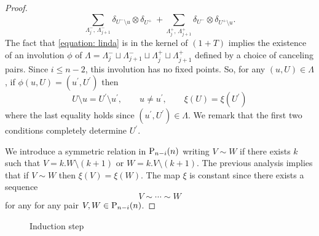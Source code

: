 \begin{proof}
    \begin{equation} \label{equation: linda}
    \sum_{\Lambda_j^-,\, \Lambda_{j+1}^-} \delta_{U^- \setminus u} \otimes \delta_{U^+} \ +
    \sum_{\Lambda_j^+,\, \Lambda_{j+1}^+} \delta_{U^-} \otimes \delta_{U^+ \setminus u}.
    \end{equation}
    The fact that \eqref{equation: linda} is in the kernel of $(1+T)$ implies the existence of an involution $\phi$ of $\Lambda = \Lambda^-_{j} \sqcup \Lambda^-_{j+1} \sqcup \Lambda^+_{j} \sqcup \Lambda^+_{j+1}$ defined by a choice of canceling pairs. Since $i \leq n-2$, this involution has no fixed points. So, for any $(u, U) \in \Lambda$, if $\phi(u, U) = (u^\prime, U^\prime)$ then
    \[
    U \setminus u = U^\prime \setminus u^\prime, \qquad u \neq u^\prime, \qquad \xi(U) = \xi(U^\prime)
    \]
    where the last equality holds since $(u^\prime, U^\prime) \in \Lambda$. We remark that the first two conditions completely determine $U^\prime$.

    We introduce a symmetric relation in $\P_{n-i}(n)$ writing $V \sim W$ if there exists $k$ such that $V = k.W \setminus(k+1)$ or $W = k.V \setminus(k+1)$. The previous analysis implies that if $V \sim W$ then $\xi(V) = \xi(W)$. The map $\xi$ is constant since there exists a sequence
    \[
    V \sim \cdots \sim W
    \]
    for any for any pair $V, W \in \P_{n-i}(n)$.


\end{proof}

\begin{figure}
    \centering
    \caption{Induction step \label{figure}}
\end{figure}

